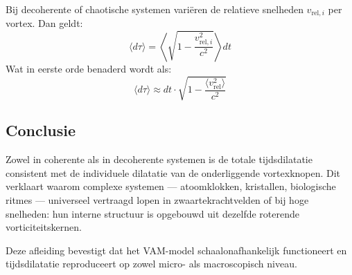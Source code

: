 Bij decoherente of chaotische systemen variëren de relatieve snelheden \( v_{\text{rel}, i} \) per vortex. Dan geldt:
\begin{equation}
    \langle d\tau \rangle = \left\langle \sqrt{1 - \frac{v_{\text{rel}, i}^2}{c^2}} \right\rangle dt
\end{equation}
Wat in eerste orde benaderd wordt als:
\begin{equation}
    \langle d\tau \rangle \approx dt \cdot \sqrt{1 - \frac{\langle v_{\text{rel}}^2 \rangle}{c^2}} \label{eq:average_dil}
\end{equation}

\subsection*{Conclusie}

Zowel in coherente als in decoherente systemen is de totale tijdsdilatatie consistent met de individuele dilatatie van de onderliggende vortexknopen. Dit verklaart waarom complexe systemen — atoomklokken, kristallen, biologische ritmes — universeel vertraagd lopen in zwaartekrachtvelden of bij hoge snelheden: hun interne structuur is opgebouwd uit dezelfde roterende vorticiteitskernen.

\vspace{1em}
\noindent
Deze afleiding bevestigt dat het VAM-model schaalonafhankelijk functioneert en tijdsdilatatie reproduceert op zowel micro- als macroscopisch niveau.